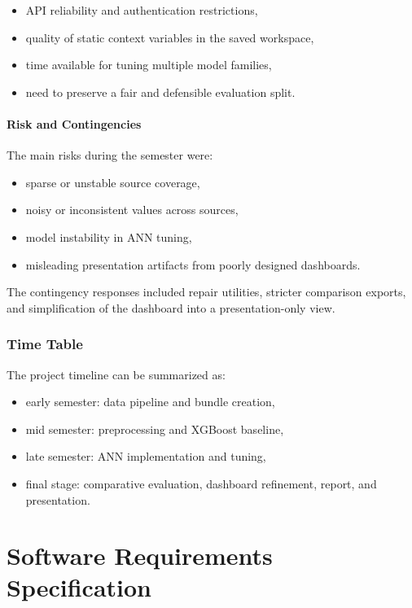 \documentclass[12pt,a4paper]{report}
\begin{document}
\begin{itemize}[leftmargin=1.3cm]
    \item API reliability and authentication restrictions,
    \item quality of static context variables in the saved workspace,
    \item time available for tuning multiple model families,
    \item need to preserve a fair and defensible evaluation split.
\end{itemize}

\subsubsection{Risk and Contingencies}
The main risks during the semester were:

\begin{itemize}[leftmargin=1.3cm]
    \item sparse or unstable source coverage,
    \item noisy or inconsistent values across sources,
    \item model instability in ANN tuning,
    \item misleading presentation artifacts from poorly designed dashboards.
\end{itemize}

The contingency responses included repair utilities, stricter comparison exports, and simplification of the dashboard into a presentation-only view.

\subsection{Time Table}
The project timeline can be summarized as:

\begin{itemize}[leftmargin=1.3cm]
    \item early semester: data pipeline and bundle creation,
    \item mid semester: preprocessing and XGBoost baseline,
    \item late semester: ANN implementation and tuning,
    \item final stage: comparative evaluation, dashboard refinement, report, and presentation.
\end{itemize}

\chapter{Software Requirements Specification}
\end{document}
